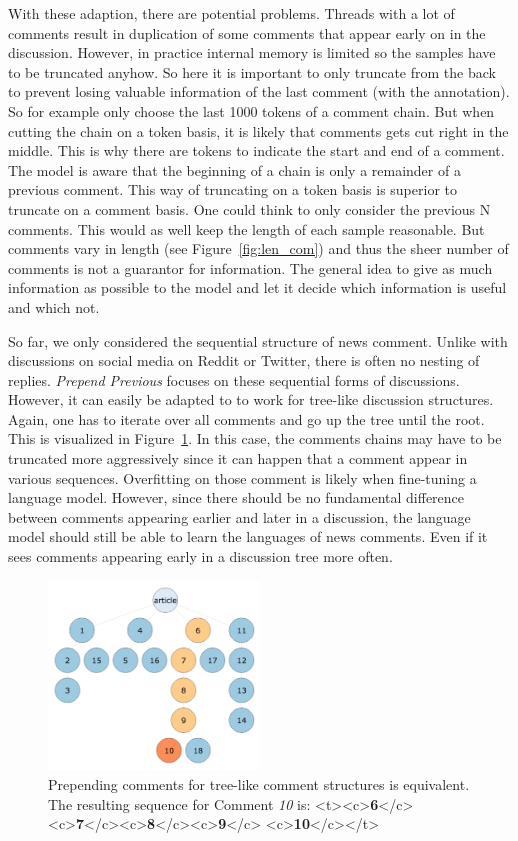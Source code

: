 With these adaption, there are potential problems.
Threads with a lot of comments result in duplication of some comments that appear early on in the discussion.
However, in practice internal memory is limited so the samples have to be truncated anyhow.
So here it is important to only truncate from the back to prevent losing valuable information of the last comment (with the annotation).
So for example only choose the last 1000 tokens of a comment chain.
But when cutting the chain on a token basis, it is likely that comments gets cut right in the middle.
This is why there are tokens to indicate the start and end of a comment.
The model is aware that the beginning of a chain is only a remainder of a previous comment.
This way of truncating on a token basis is superior to truncate on a comment basis.
One could think to only consider the previous N comments.
This would as well keep the length of each sample reasonable.
But comments vary in length (see Figure~\ref{fig:len_com}) and thus the sheer number of comments is not a guarantor for information.
The general idea to give as much information as possible to the model and let it decide which information is useful and which not.

So far, we only considered the sequential structure of news comment. Unlike with discussions on social media on Reddit or Twitter, there is often no nesting of replies. \textit{Prepend Previous} focuses on these sequential forms of discussions.
However, it can easily be adapted to to work for tree-like discussion structures.
Again, one has to iterate over all comments and go up the tree until the root.
This is visualized in Figure~\ref{fig:appr_tree_pp}.
In this case, the comments chains may have to be truncated more aggressively since it can happen that a comment appear in various sequences.
Overfitting on those comment is likely when fine-tuning a language model.
However, since there should be no fundamental difference between comments appearing earlier and later in a discussion, the language model should still be able to learn the languages of news comments.
Even if it sees comments appearing early in a discussion tree more often.

\begin{figure}
  \begin{center}
    \includegraphics[width=0.5\textwidth]{images/approach/tree_10.png}
  \end{center}
  \caption{Prepending comments for tree-like comment structures is equivalent. The resulting sequence for Comment \textit{10} is: <t><c>\textbf{6}</c><c>\textbf{7}</c><c>\textbf{8}</c><c>\textbf{9}</c> <c>\textbf{10}</c></t>}
   \label{fig:appr_tree_pp}
\end{figure}

